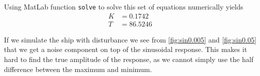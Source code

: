Using MatLab function \texttt{solve} to solve this set of equations numerically yields
\begin{subequations}
	\begin{align}
		K &= 0.1742 \\
		T &= 86.5246
	\end{align}
\end{subequations}

If we simulate the ship with disturbance we see from \cref{fig:sin0.005}  and \cref{fig:sin0.05} that we get a noise component on top of the sinusoidal response. This makes it hard to find the true amplitude of the response, as we cannot simply use the half difference between the maximum and minimum.
